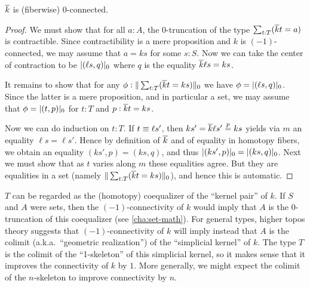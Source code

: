 \begin{lem}\label{thm:kbar}
  $\kbar$ is (fiberwise) 0-connected.
\end{lem}
\begin{proof}
  We must show that for all $a:A$, the 0-truncation of the type $\sum_{t:T}(\kbar t = a)$ is contractible.
  Since contractibility is a mere proposition and $k$ is $(-1)$-connected, we may assume that $a=ks$ for some $s:S$.
  Now we can take the center of contraction to be $\tproj0{(\ell s,q)}$ where $q$ is the equality $\kbar\ell s = k s$.

  It remains to show that for any $\phi:\trunc0{\sum_{t:T} (\kbar t = ks)}$ we have $\phi = \tproj0{(\ell s,q)}$.
  Since the latter is a mere proposition, and in particular a set, we may assume that $\phi=\tproj0{(t,p)}$ for $t:T$ and $p:\kbar t = ks$.

  Now we can do induction on $t:T$.
  If $t\jdeq\ell s'$, then $ks' = \kbar \ell s' \overset{p}{=} ks$ yields via $m$ an equality $\ell s = \ell s'$.
  Hence by definition of $\kbar$ and of equality in homotopy fibers, we obtain an equality $(ks',p) = (ks,q)$, and thus $\tproj0{(ks',p)} = \tproj0{(ks,q)}$.
  Next we must show that as $t$ varies along $m$ these equalities agree.
  But they are equalities in a set (namely $\trunc0{\sum_{t:T} (\kbar t = ks)}$), and hence this is automatic.
\end{proof}

\begin{rmk}
  $T$ can be regarded as the (homotopy) coequalizer of the ``kernel pair'' of $k$.
  If $S$ and $A$ were sets, then the $(-1)$-connectivity of $k$ would imply that $A$ is the $0$-truncation of this coequalizer (see \autoref{cha:set-math}).
  For general types, higher topos theory suggests that $(-1)$-connectivity of $k$ will imply instead that $A$ is the colimit (a.k.a.\ ``geometric realization'') of the ``simplicial kernel'' of $k$.
  The type $T$ is the colimit of the ``1-skeleton'' of this simplicial kernel, so it makes sense that it improves the connectivity of $k$ by $1$.
  More generally, we might expect the colimit of the $n$-skeleton to improve connectivity by $n$.
\end{rmk}

